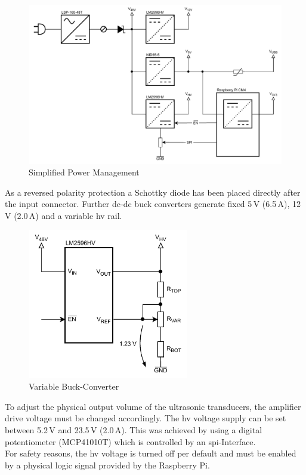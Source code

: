\begin{figure}[h!]
	\centering
	\includegraphics[width=\textwidth]{images/4_Design/Hardware/Power Supply Overview.pdf}
	\vspace{-0.6cm}
    \caption{Simplified Power Management}
    \label{fig:simplified-power}
\end{figure}

As a reversed polarity protection a Schottky diode has been placed directly after the input connector. Further \acrshort{dc}-\acrshort{dc} buck converters generate fixed 5\,V (6.5\,A), 12\,V (2.0\,A) and a variable \acrshort{hv} rail.


\bigskip
\begin{figure}
    \vspace{-0.6cm}
    \includegraphics[width=7cm]{images/4_Design/Hardware/Variable Buck-Converter.pdf}
    \vspace{-0.6cm}
    \caption{Variable Buck-Converter}
    \label{fig:variable-buck-converter}
\end{figure} 
To adjust the physical output volume of the ultrasonic transducers, the amplifier drive voltage must be changed accordingly. The \acrshort{hv} voltage supply can be set between 5.2\,V and 23.5\,V (2.0\,A). This was achieved by using a digital potentiometer (MCP41010T) which is controlled by an \acrshort{spi}-Interface.\\
For safety reasons, the \acrshort{hv} voltage is turned off per default and must be enabled by a physical logic signal provided by the Raspberry Pi.
\clearpage

